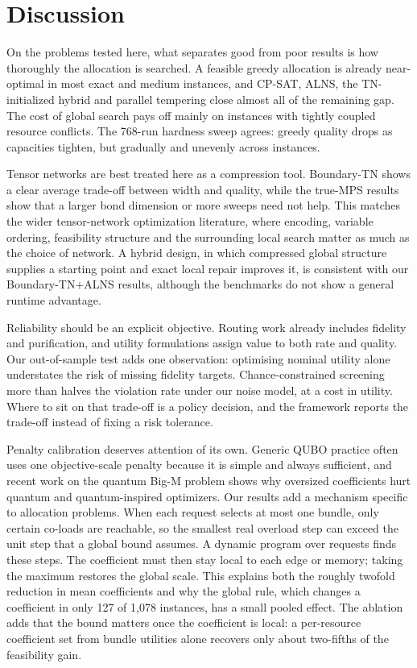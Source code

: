 \documentclass[pdflatex,sn-nature]{sn-jnl}
\theoremstyle{plain}
\theoremstyle{remark}
\begin{document}
\section{Discussion}\label{sec:discussion}

On the problems tested here, what separates good from poor results is how thoroughly the allocation is searched. A feasible greedy allocation is already near-optimal in most exact and medium instances, and CP-SAT, ALNS, the TN-initialized hybrid and parallel tempering close almost all of the remaining gap. The cost of global search pays off mainly on instances with tightly coupled resource conflicts. The 768-run hardness sweep agrees: greedy quality drops as capacities tighten, but gradually and unevenly across instances.

Tensor networks are best treated here as a compression tool. Boundary-TN shows a clear average trade-off between width and quality, while the true-MPS results show that a larger bond dimension or more sweeps need not help. This matches the wider tensor-network optimization literature, where encoding, variable ordering, feasibility structure and the surrounding local search matter as much as the choice of network\cite{hao2022,nakada2025,preisser2026}. A hybrid design, in which compressed global structure supplies a starting point and exact local repair improves it, is consistent with our Boundary-TN+ALNS results, although the benchmarks do not show a general runtime advantage.

Reliability should be an explicit objective. Routing work already includes fidelity and purification\cite{li2021,xiao2024,halder2024,halder2026}, and utility formulations assign value to both rate and quality\cite{vardoyan2023,kar2025,kar2026}. Our out-of-sample test adds one observation: optimising nominal utility alone understates the risk of missing fidelity targets. Chance-constrained screening more than halves the violation rate under our noise model, at a cost in utility. Where to sit on that trade-off is a policy decision, and the framework reports the trade-off instead of fixing a risk tolerance.

Penalty calibration deserves attention of its own. Generic QUBO practice often uses one objective-scale penalty because it is simple and always sufficient\cite{glover2019,verma2022}, and recent work on the quantum Big-M problem shows why oversized coefficients hurt quantum and quantum-inspired optimizers\cite{alessandroni2025}. Our results add a mechanism specific to allocation problems. When each request selects at most one bundle, only certain co-loads are reachable, so the smallest real overload step can exceed the unit step that a global bound assumes. A dynamic program over requests finds these steps. The coefficient must then stay local to each edge or memory; taking the maximum restores the global scale. This explains both the roughly twofold reduction in mean coefficients and why the global rule, which changes a coefficient in only 127 of 1,078 instances, has a small pooled effect. The ablation adds that the bound matters once the coefficient is local: a per-resource coefficient set from bundle utilities alone recovers only about two-fifths of the feasibility gain.
\end{document}
